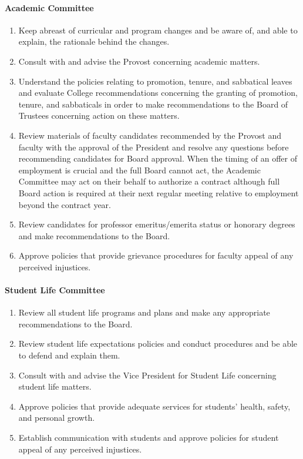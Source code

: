 \documentclass[letterpaper, 11pt]{article}
\begin{document}
			\paragraph{Academic Committee}
				\begin{enumerate}
					\item{Keep abreast of curricular and program changes and be aware of, and able to explain, the rationale behind the changes.}
					\item{Consult with and advise the Provost concerning academic matters.}
					\item{Understand the policies relating to promotion, tenure, and sabbatical leaves and evaluate College recommendations concerning the granting of promotion, tenure, and sabbaticals in order to make recommendations to the Board of Trustees concerning action on these matters.}
					\item{Review materials of faculty candidates recommended by the Provost and faculty with the approval of the President and resolve any questions before recommending candidates for Board approval.  When the timing of an offer of employment is crucial and the full Board cannot act, the Academic Committee may act on their behalf to authorize a contract although full Board action is required at their next regular meeting relative to employment beyond the contract year.}
					\item{Review candidates for professor emeritus/emerita status or honorary degrees and make recommendations to the Board.}
					\item{Approve policies that provide grievance procedures for faculty appeal of any perceived injustices.}
				\end{enumerate}
			\paragraph{Student Life Committee}
				\begin{enumerate}
					\item{Review all student life programs and plans and make any appropriate recommendations to the Board.}
					\item{Review student life expectations policies and conduct procedures and be able to defend and explain them.}
					\item{Consult with and advise the Vice President for Student Life concerning student life matters.}
					\item{Approve policies that provide adequate services for students' health, safety, and personal growth.}
					\item{Establish communication with students and approve policies for student appeal of any perceived injustices.}
				\end{enumerate}
\end{document}
